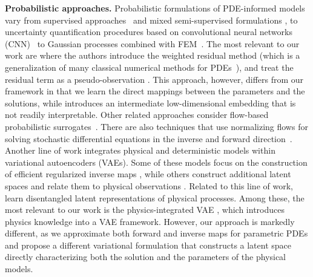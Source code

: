 \documentclass[11pt, fleqn]{article}
\begin{document}
\noindent\textbf{Probabilistic approaches.} Probabilistic formulations of PDE-informed models vary from supervised approaches~\cite{yang2019conditional} and mixed semi-supervised formulations \cite{yang2019adversarial}, to uncertainty quantification procedures based on convolutional neural networks (CNN)~\cite{winovich2019convpde} to Gaussian processes combined with \gls*{FEM}~\cite{cockayne2019bayesian, girolami2021statistical, duffin2021statistical, akyildiz2022statistical}. The most relevant to our work are \cite{kaltenbach2020incorporating, rixner2021probabilistic} where the authors introduce the weighted residual method (which is a generalization of many classical numerical methods for PDEs~\cite{strang1986introduction, chakraverty2019advanced, hatami2017weighted, finlayson2013method, lindgren2009weighted, gerald2004applied}), and treat the residual term as a pseudo-observation \cite{rixner2021probabilistic}. This approach, however, differs from our framework in that we learn the direct mappings between the parameters and the solutions, while \cite{rixner2021probabilistic} introduces an intermediate low-dimensional embedding that is not readily interpretable. Other related approaches consider flow-based probabilistic surrogates~\cite{zhu2019physics}. There are also techniques that use normalizing flows for solving stochastic differential equations in the inverse and forward direction~\cite{guo2022normalizing}. Another line of work integrates physical and deterministic models within variational autoencoders (VAEs). Some of these models focus on the construction of efficient regularized inverse maps \cite{o2019learning, tait2020variational}, while others construct additional latent spaces and relate them to physical observations \cite{qian2021integrating, zhong2023pi}. Related to this line of work, \cite{jacobsen2022disentangling} learn disentangled latent representations of physical processes. Among these, the most relevant to our work is the physics-integrated VAE \cite{takeishi2021physics}, which introduces physics knowledge into a VAE framework. However, our approach is markedly different, as we approximate both forward and inverse maps for parametric PDEs and propose a different variational formulation that constructs a latent space directly characterizing both the solution and the parameters of the physical models.

\end{document}

